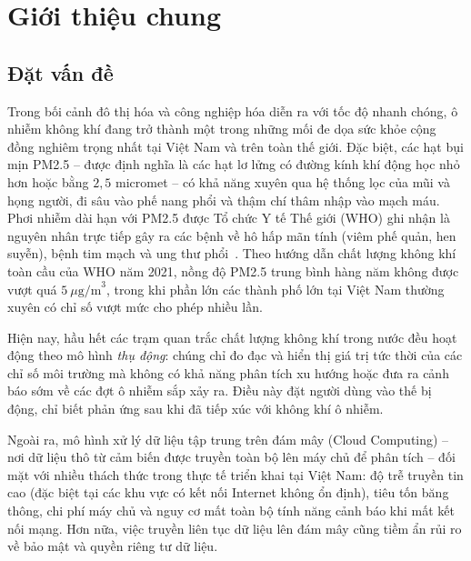 \documentclass[12pt,a4paper]{article}
\begin{document}
\newpage
\tableofcontents
\newpage

\section{Giới thiệu chung}

\subsection{Đặt vấn đề}

Trong bối cảnh đô thị hóa và công nghiệp hóa diễn ra với tốc độ nhanh chóng, ô nhiễm không khí đang trở thành một trong những mối đe dọa sức khỏe cộng đồng nghiêm trọng nhất tại Việt Nam và trên toàn thế giới. Đặc biệt, các hạt bụi mịn PM2.5 -- được định nghĩa là các hạt lơ lửng có đường kính khí động học nhỏ hơn hoặc bằng $2{,}5$ micromet -- có khả năng xuyên qua hệ thống lọc của mũi và họng người, đi sâu vào phế nang phổi và thậm chí thâm nhập vào mạch máu. Phơi nhiễm dài hạn với PM2.5 được Tổ chức Y tế Thế giới (WHO) ghi nhận là nguyên nhân trực tiếp gây ra các bệnh về hô hấp mãn tính (viêm phế quản, hen suyễn), bệnh tim mạch và ung thư phổi~\cite{who}. Theo hướng dẫn chất lượng không khí toàn cầu của WHO năm 2021, nồng độ PM2.5 trung bình hàng năm không được vượt quá $5~\mu\text{g/m}^3$, trong khi phần lớn các thành phố lớn tại Việt Nam thường xuyên có chỉ số vượt mức cho phép nhiều lần.

Hiện nay, hầu hết các trạm quan trắc chất lượng không khí trong nước đều hoạt động theo mô hình \textit{thụ động}: chúng chỉ đo đạc và hiển thị giá trị tức thời của các chỉ số môi trường mà không có khả năng phân tích xu hướng hoặc đưa ra cảnh báo sớm về các đợt ô nhiễm sắp xảy ra. Điều này đặt người dùng vào thế bị động, chỉ biết phản ứng sau khi đã tiếp xúc với không khí ô nhiễm.

Ngoài ra, mô hình xử lý dữ liệu tập trung trên đám mây (Cloud Computing) -- nơi dữ liệu thô từ cảm biến được truyền toàn bộ lên máy chủ để phân tích -- đối mặt với nhiều thách thức trong thực tế triển khai tại Việt Nam: độ trễ truyền tin cao (đặc biệt tại các khu vực có kết nối Internet không ổn định), tiêu tốn băng thông, chi phí máy chủ và nguy cơ mất toàn bộ tính năng cảnh báo khi mất kết nối mạng. Hơn nữa, việc truyền liên tục dữ liệu lên đám mây cũng tiềm ẩn rủi ro về bảo mật và quyền riêng tư dữ liệu.
\end{document}
